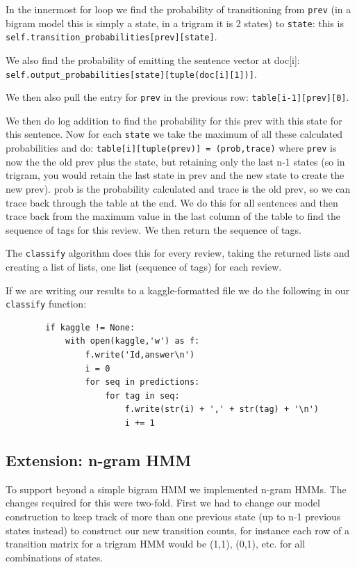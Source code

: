 \documentclass{article}
\begin{document}
In the innermost for loop we find the probability of transitioning from \texttt{prev} (in a bigram model this is simply a state, in a trigram it is 2 states) to \texttt{state}: this is \texttt{self.transition\_probabilities[prev][state]}.\par
We also find the probability of emitting the sentence vector at doc[i]:\\
\texttt{self.output\_probabilities[state][tuple(doc[i][1])]}.\par

We then also pull the entry for \texttt{prev} in the previous row: \texttt{table[i-1][prev][0]}.\par

We then do log addition to find the probability for this prev with this state for this sentence. Now for each \texttt{state} we take the maximum of all these calculated probabilities and do: \texttt{table[i][tuple(prev)] = (prob,trace)} where \texttt{prev} is now the the old prev plus the state, but retaining only the last n-1 states (so in trigram, you would retain the last state in prev and the new state to create the new prev). prob is the probability calculated and trace is the old prev, so we can trace back through the table at the end. We do this for all sentences and then trace back from the maximum value in the last column of the table to find the sequence of tags for this review. We then return the sequence of tags. 

The \texttt{classify} algorithm does this for every review, taking the returned lists and creating a list of lists, one list (sequence of tags) for each review. 

If we are writing our results to a kaggle-formatted file we do the following in our \texttt{classify} function: 
\begin{verbatim}
        if kaggle != None:
            with open(kaggle,'w') as f:
                f.write('Id,answer\n')
                i = 0
                for seq in predictions:
                    for tag in seq:
                        f.write(str(i) + ',' + str(tag) + '\n')
                        i += 1
\end{verbatim}

\subsection{Extension: n-gram HMM}
To support beyond a simple bigram HMM we implemented n-gram HMMs. The changes required for this were two-fold. First we had to change our model construction to keep track of more than one previous state (up to n-1 previous states instead) to construct our new transition counts, for instance each row of a transition matrix for a trigram HMM would be (1,1), (0,1), etc. for all combinations of states. 
\end{document}
